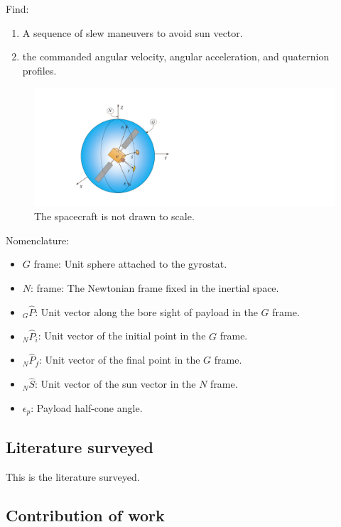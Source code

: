 \documentclass[letterpaper, preprint, paper,11pt]{AAS}	%
\begin{document}
		Find: 
		\begin{enumerate}
			\item A sequence of slew maneuvers to avoid sun vector.
			\item the commanded angular velocity, angular acceleration, and quaternion profiles.
		\end{enumerate} 
		\begin{figure}[htb]
			\begin{center}
			\includegraphics[width=6in]{./Figures/SAS_Schematic}
			\caption{The spacecraft is not drawn to scale.}
			\end{center}
		\end{figure}
	
		Nomenclature: 
		\begin{itemize}
			\item $G$ frame: Unit sphere attached to the gyrostat.
			\item $N$: frame: The Newtonian frame fixed in the inertial space.
			\item $_G\hat{P}$: Unit vector along the bore sight of payload in the $G$ frame.
			\item $_N\hat{P}_i$: Unit vector of the initial point in the $G$ frame.
			\item $_N\hat{P}_f$: Unit vector of the final point in the $G$ frame.
			\item $_N\hat{S}$: Unit vector of the sun vector in the $N$ frame.
			\item $\epsilon_p$: Payload half-cone angle.
		\end{itemize}

	\clearpage
	\subsection{Literature surveyed}
	
		This is the literature surveyed. 
	
	\subsection{Contribution of work} 
	
\end{document}

